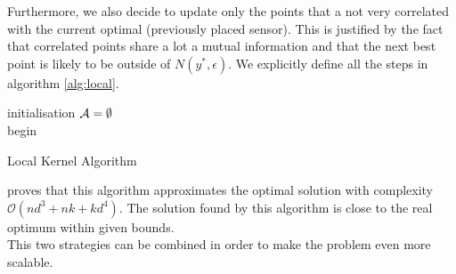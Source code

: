 Furthermore, we also decide to update only the points that a not very correlated with the current optimal (previously placed sensor). This is justified by the fact that correlated points share a lot a mutual information and that the next best point is likely to be outside of $N(y^*,\epsilon)$. We explicitly define all the steps in algorithm \ref{alg:local}. \\

\begin{algorithm}[h]
 initialisation\;
 $\mathcal{A} = \emptyset$ \\
 begin\;
\caption{Local Kernel Algorithm}
\label{alg:local}
\end{algorithm} 


\citet{krause_near-optimal_2008} proves that this algorithm approximates the optimal solution with complexity $\mathcal{O}(nd^3 + nk + kd^4)$. The solution found by this algorithm is close to the real optimum within given bounds. \\

This two strategies can be combined in order to make the problem even more scalable. 

